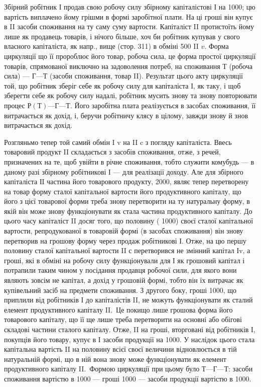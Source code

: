 
Збірний робітник І продав свою робочу силу збірному капіталістові
І на 1000; цю вартість виплачено йому грішми в формі заробітної плати.
На ці гроші він купує в II засоби споживання на ту саму суму
вартости. Капіталіст II протистоїть йому лише як продавець товарів, і
нічого більше, хоч би робітник купував у свого власного капіталіста, як
напр., вище (стор. 311) в обміні 500 II $v$. Форма циркуляції що її пророблює
його товар, робоча сила, це форма простої циркуляції товарів, спрямованої
виключно на задоволення потреб, на споживання $Т$ (робоча сила) —
$Г — Т$ (засоби споживання, товар II). Результат цього акту циркуляції
той, що робітник зберіг себе як робочу силу для капіталіста І, як таку,
і щоб зберегти себе як робочу силу надалі, робітник мусить знову та
знову повторювати процес $Р (Т) — Г — Т$. Його заробітна плата реалізується
в засобах споживання, її витрачається як дохід, і, беручи
робітничу клясу в цілому, завжди знову й знов витрачається як дохід.

Розгляньмо тепер той самий обмін I v на II c з погляду капіталіста. Ввесь
товаровий продукт II складається з засобів споживання, отже, з речей,
призначених на те, щоб увійти в річне споживання, тобто служити комубудь
— в даному разі збірному робітникові І — для реалізації доходу. Але
для збірного капіталіста ІI частина його товарового продукту, \deq{} 2000,
являє тепер перетворену на товар форму сталої капітальної вартости
його продуктивного капіталу, що його з цієї товарової форми треба
знову перетворити на ту натуральну форму, в якій він може знову
функціонувати як стала частина продуктивного капіталу. До цього часу
капіталіст II досяг того, що половину (\deq{} 1000) своєї сталої капітальної
вартости, репродукованої в товаровій формі (в засобах споживання) він
знову перетворив на грошову форму через продаж робітникові І. Отже,
на цю першу половину сталої капітальної вартости II с перетворився не
змінний капітал Іv, а гроші, які в обміні на робочу силу функціонували
для І як грошовий капітал і потрапили таким чином у посідання продавця
робочої сили, для якого вони являють зовсім не капітал, а дохід
у грошовій формі, тобто він їх витрачає як купівельний засіб на предмети
споживання. З другого боку, гроші \deq{} 1000, що приплили від робітників
І до капіталістів II, не можуть функціонувати як сталий елемент
продуктивного капіталу II.~Це покищо лише грошова форма його товарового
капіталу, що її ще лише треба перетворити на основні або обігові
складові частини сталого капіталу. Отже, II на гроші, вторговані від
робітників І, покупців його товару, купує в І засоби продукції на 1000.
У наслідок цього стала капітальна вартість II на половину всієї своєї
величини відновлюється в тій натуральній формі, що в ній вона знову
може функціонувати як елемент продуктивного капіталу II.~Формою
циркуляції при цьому було $Т — Г — Т$: засоби споживання вартістю в 1000 —
гроші \deq{} 1000 — засоби продукції вартістю в 1000.

